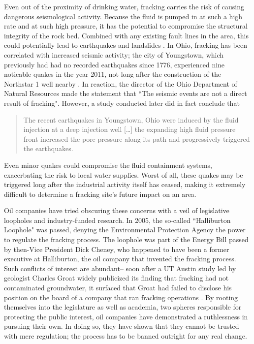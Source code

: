 \documentclass[12pt,letterpaper]{article}
\begin{document}
Even out of the proximity of drinking water, fracking carries the risk of causing dangerous seismological activity. Because the fluid is pumped in at such a high rate and at such high pressure, it has the potential to compromise the structural integrity of the rock bed. Combined with any existing fault lines in the area, this could potentially lead to earthquakes and landslides \cite{quake}.
In Ohio, fracking has been correlated with increased seismic activity; the city of Youngstown, which previously had had no recorded earthquakes since 1776, experienced nine noticable quakes in the year 2011, not long after the construction of the Northstar 1 well nearby \cite{quake2}. In reaction, the director of the Ohio Department of Natural Resources made the statement that
``The seismic events are not a direct result of fracking". However, a study conducted later did in fact conclude that
\begin{quote}
The recent earthquakes in Youngstown, Ohio were induced by the fluid injection at a deep injection well [\ldots] the expanding high fluid pressure front increased the pore pressure along its path and progressively triggered the earthquakes. \cite[1]{quake3}
\end{quote}
Even minor quakes could compromise the fluid containment systems, exacerbating the risk to local water supplies. Worst of all, these quakes may be triggered long after the industrial activity itself has ceased, making it extremely difficult to determine a fracking site's future impact on an area.

Oil companies have tried obscuring these concerns with a veil of legislative loopholes and industry-funded research. In 2005, the so-called ``Halliburton Loophole" was passed, denying the Environmental Protection Agency the power to regulate the fracking process. The loophole was part of the Energy Bill passed by then-Vice President Dick Cheney, who happened to have been a former executive at Halliburton, the oil company that invented the fracking process. Such conflicts of interest are abundant-- soon after a UT Austin study led by geologist Charles Groat widely publicized its finding that fracking had not contaminated groundwater, it surfaced that Groat had failed to disclose his position on the board of a company that ran fracking operations \cite{groat}.
By rooting themselves into the legislature as well as academia, two spheres responsible for protecting the public interest, oil companies have demonstrated a ruthlessness in pursuing their own.
In doing so, they have shown that they cannot be trusted with mere regulation; the process has to be banned outright for any real change.
\end{document}
